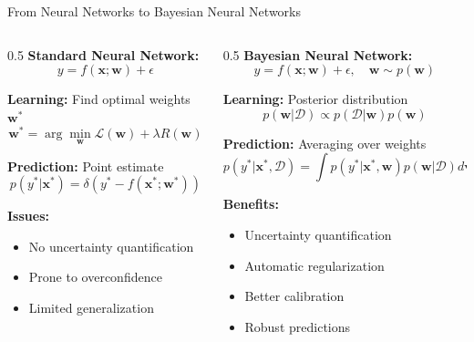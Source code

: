 \documentclass[aspectratio=169,11pt]{beamer}
\newcommand{\bw}{\mathbf{w}}
\newcommand{\bx}{\mathbf{x}}
\begin{document}
\begin{frame}{From Neural Networks to Bayesian Neural Networks}
\begin{columns}
\begin{column}{0.5\textwidth}
\textbf{Standard Neural Network:}
\[y = f(\bx; \bw) + \epsilon\]

\textbf{Learning:} Find optimal weights $\bw^*$
\[\bw^* = \arg\min_{\bw} \mathcal{L}(\bw) + \lambda R(\bw)\]

\textbf{Prediction:} Point estimate
\[p(y^*|\bx^*) = \delta(y^* - f(\bx^*; \bw^*))\]

\vspace{0.3cm}
\textbf{Issues:}
\begin{itemize}
\item No uncertainty quantification
\item Prone to overconfidence
\item Limited generalization
\end{itemize}
\end{column}
\begin{column}{0.5\textwidth}
\textbf{Bayesian Neural Network:}
\[y = f(\bx; \bw) + \epsilon, \quad \bw \sim p(\bw)\]

\textbf{Learning:} Posterior distribution
\[p(\bw|\mathcal{D}) \propto p(\mathcal{D}|\bw) p(\bw)\]

\textbf{Prediction:} Averaging over weights
\[p(y^*|\bx^*, \mathcal{D}) = \int p(y^*|\bx^*, \bw) p(\bw|\mathcal{D}) d\bw\]

\vspace{0.3cm}
\textbf{Benefits:}
\begin{itemize}
\item \textcolor{forest}{Uncertainty quantification}
\item \textcolor{forest}{Automatic regularization}
\item \textcolor{forest}{Better calibration}
\item \textcolor{forest}{Robust predictions}
\end{itemize}
\end{column}
\end{columns}
\end{frame}
\end{document}
